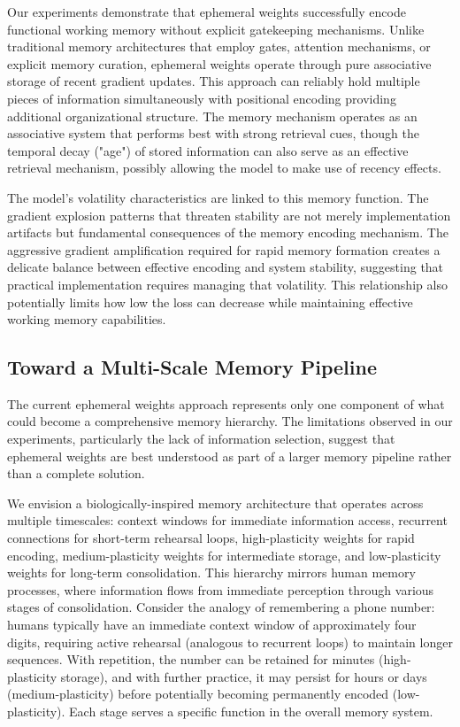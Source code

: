 Our experiments demonstrate that ephemeral weights successfully encode functional working memory without explicit gatekeeping mechanisms. Unlike traditional memory architectures that employ gates, attention mechanisms, or explicit memory curation, ephemeral weights operate through pure associative storage of recent gradient updates. This approach can reliably hold multiple pieces of information simultaneously with positional encoding providing additional organizational structure. The memory mechanism operates as an associative system that performs best with strong retrieval cues, though the temporal decay ("age") of stored information can also serve as an effective retrieval mechanism, possibly allowing the model to make use of recency effects.

The model's volatility characteristics are linked to this memory function. The gradient explosion patterns that threaten stability are not merely implementation artifacts but fundamental consequences of the memory encoding mechanism. The aggressive gradient amplification required for rapid memory formation creates a delicate balance between effective encoding and system stability, suggesting that practical implementation requires managing that volatility. This relationship also potentially limits how low the loss can decrease while maintaining effective working memory capabilities.

\subsection{Toward a Multi-Scale Memory Pipeline}

The current ephemeral weights approach represents only one component of what could become a comprehensive memory hierarchy. The limitations observed in our experiments, particularly the lack of information selection, suggest that ephemeral weights are best understood as part of a larger memory pipeline rather than a complete solution.

We envision a biologically-inspired memory architecture that operates across multiple timescales: context windows for immediate information access, recurrent connections for short-term rehearsal loops, high-plasticity weights for rapid encoding, medium-plasticity weights for intermediate storage, and low-plasticity weights for long-term consolidation. This hierarchy mirrors human memory processes, where information flows from immediate perception through various stages of consolidation. Consider the analogy of remembering a phone number: humans typically have an immediate context window of approximately four digits, requiring active rehearsal (analogous to recurrent loops) to maintain longer sequences. With repetition, the number can be retained for minutes (high-plasticity storage), and with further practice, it may persist for hours or days (medium-plasticity) before potentially becoming permanently encoded (low-plasticity). Each stage serves a specific function in the overall memory system.


